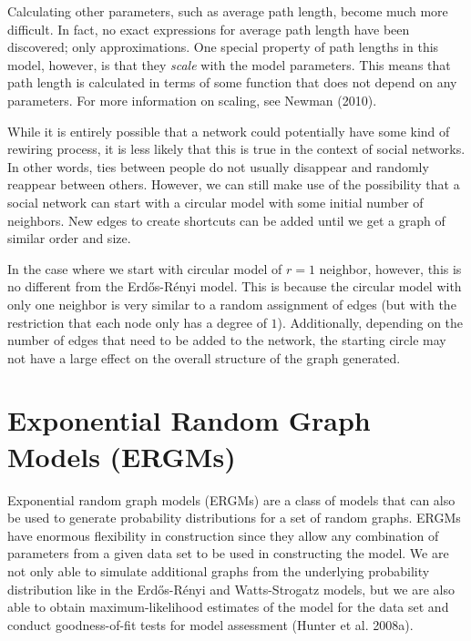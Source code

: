 \documentclass[12pt,twoside]{amherstthesis}
\begin{document}
  Calculating other parameters, such as average path length, become much
  more difficult. In fact, no exact expressions for average path length
  have been discovered; only approximations. One special property of path
  lengths in this model, however, is that they \emph{scale} with the model
  parameters. This means that path length is calculated in terms of some
  function that does not depend on any parameters. For more information on
  scaling, see Newman (2010).
  
  While it is entirely possible that a network could potentially have some
  kind of rewiring process, it is less likely that this is true in the
  context of social networks. In other words, ties between people do not
  usually disappear and randomly reappear between others. However, we can
  still make use of the possibility that a social network can start with a
  circular model with some initial number of neighbors. New edges to
  create shortcuts can be added until we get a graph of similar order and
  size.
  
  In the case where we start with circular model of \(r = 1\) neighbor,
  however, this is no different from the Erdős-Rényi model. This is
  because the circular model with only one neighbor is very similar to a
  random assignment of edges (but with the restriction that each node only
  has a degree of \(1\)). Additionally, depending on the number of edges
  that need to be added to the network, the starting circle may not have a
  large effect on the overall structure of the graph generated.
  
  \section{Exponential Random Graph Models
  (ERGMs)}\label{exponential-random-graph-models-ergms}
  
  Exponential random graph models (ERGMs) are a class of models that can
  also be used to generate probability distributions for a set of random
  graphs. ERGMs have enormous flexibility in construction since they allow
  any combination of parameters from a given data set to be used in
  constructing the model. We are not only able to simulate additional
  graphs from the underlying probability distribution like in the
  Erdős-Rényi and Watts-Strogatz models, but we are also able to obtain
  maximum-likelihood estimates of the model for the data set and conduct
  goodness-of-fit tests for model assessment (Hunter et al. 2008a).
  
\end{document}
